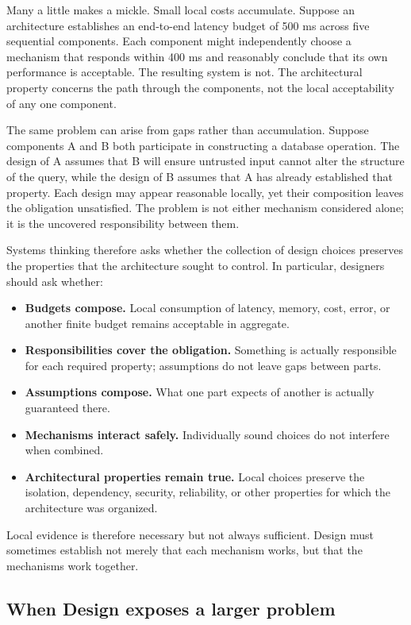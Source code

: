 Many a little makes a mickle.
Small local costs accumulate.
Suppose an architecture establishes an end-to-end latency budget of 500 ms across five sequential components.
Each component might independently choose a mechanism that responds within 400 ms and reasonably conclude that its own performance is acceptable.
The resulting system is not.
The architectural property concerns the path through the components, not the local acceptability of any one component.

The same problem can arise from gaps rather than accumulation.
Suppose components A and B both participate in constructing a database operation.
The design of A assumes that B will ensure untrusted input cannot alter the structure of the query, while the design of B assumes that A has already established that property.
Each design may appear reasonable locally, yet their composition leaves the obligation unsatisfied.
The problem is not either mechanism considered alone; it is the uncovered responsibility between them.

Systems thinking therefore asks whether the collection of design choices preserves the properties that the architecture sought to control.
In particular, designers should ask whether:

\begin{itemize}
\tightlist
\item
  \textbf{Budgets compose.} Local consumption of latency, memory, cost, error, or another finite budget remains acceptable in aggregate.
\item
  \textbf{Responsibilities cover the obligation.} Something is actually responsible for each required property; assumptions do not leave gaps between parts.
\item
  \textbf{Assumptions compose.} What one part expects of another is actually guaranteed there.
\item
  \textbf{Mechanisms interact safely.} Individually sound choices do not interfere when combined.
\item
  \textbf{Architectural properties remain true.} Local choices preserve the isolation, dependency, security, reliability, or other properties for which the architecture was organized.
\end{itemize}

Local evidence is therefore necessary but not always sufficient.
Design must sometimes establish not merely that each mechanism works, but that the mechanisms work together.

\subsection{When Design exposes a larger problem}\label{when-design-exposes-a-larger-problem}

